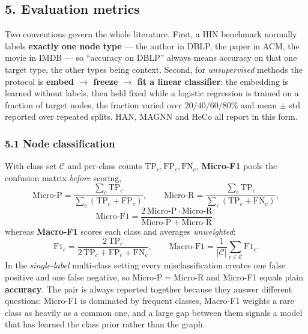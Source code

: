 \newcommand{\pTwoTgt}{orange!22}
\newcommand{\pTwoAgt}{blue!12}
\newcommand{\pTwoAtt}{green!14}
\newcommand{\pTwoVen}{purple!12}

\subsection*{5. Evaluation metrics}
\label{p2:sec:metrics}

Two conventions govern the whole literature. First, a HIN benchmark normally labels
\textbf{exactly one node type} --- the author in DBLP, the paper in ACM, the movie in IMDB --- so
``accuracy on DBLP'' always means accuracy on that one target type, the other types being context.
Second, for \emph{unsupervised} methods the protocol is \textbf{embed $\to$ freeze $\to$ fit a
linear classifier}: the embedding is learned without labels, then held fixed while a logistic
regression is trained on a fraction of target nodes, the fraction varied over $20/40/60/80\%$ and
mean $\pm$ std reported over repeated splits. HAN, MAGNN and HeCo all report in this form.

\subsubsection*{5.1 Node classification}

With class set $\mathcal{C}$ and per-class counts $\mathrm{TP}_c,\mathrm{FP}_c,\mathrm{FN}_c$,
\textbf{Micro-F1} pools the confusion matrix \emph{before} scoring,
\[
  \mathrm{Micro\text{-}P}=\frac{\sum_{c}\mathrm{TP}_c}{\sum_{c}(\mathrm{TP}_c+\mathrm{FP}_c)},
  \qquad
  \mathrm{Micro\text{-}R}=\frac{\sum_{c}\mathrm{TP}_c}{\sum_{c}(\mathrm{TP}_c+\mathrm{FN}_c)},
\]
\[
  \mathrm{Micro\text{-}F1}
   =\frac{2\,\mathrm{Micro\text{-}P}\cdot\mathrm{Micro\text{-}R}}
          {\mathrm{Micro\text{-}P}+\mathrm{Micro\text{-}R}},
\]
whereas \textbf{Macro-F1} scores each class and averages \emph{unweighted}:
\[
  \mathrm{F1}_c=\frac{2\,\mathrm{TP}_c}{2\,\mathrm{TP}_c+\mathrm{FP}_c+\mathrm{FN}_c},
  \qquad
  \mathrm{Macro\text{-}F1}=\frac{1}{|\mathcal{C}|}\sum_{c\in\mathcal{C}}\mathrm{F1}_c .
\]
In the \emph{single-label} multi-class setting every misclassification creates one false positive
and one false negative, so $\mathrm{Micro\text{-}P}=\mathrm{Micro\text{-}R}$ and Micro-F1 equals
plain \textbf{accuracy}. The pair is always reported together because they answer different
questions: Micro-F1 is dominated by frequent classes, Macro-F1 weights a rare class as heavily as a
common one, and a large gap between them signals a model that has learned the class prior rather
than the graph.

